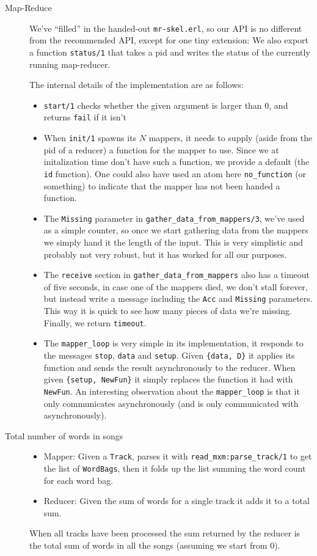\documentclass[a4paper]{article}
\begin{document}
\begin{description}
\item[Map-Reduce] We've ``filled'' in the handed-out \texttt{mr-skel.erl}, so our API is no different from the recommended API, except for one tiny extension: We also export a function \texttt{status/1} that takes a pid and writes the status of the currently running map-reducer.
  
  The internal details of the implementation are as follows:
  \begin{itemize}
  \item \texttt{start/1} checks whether the given argument is larger than $0$, and returns \texttt{fail} if it isn't
  \item When \texttt{init/1} spawns its $N$ mappers, it needs to supply (aside from the pid of a reducer) a function for the mapper to use. Since we at initalization time don't have such a function, we provide a default (the \texttt{id} function). One could also have used an atom here \texttt{no\_function} (or something) to indicate that the mapper has not been handed a function.
  \item The \texttt{Missing} parameter in \texttt{gather\_data\_from\_mappers/3}, we've used as a simple counter, so once we start gathering data from the mappers we simply hand it the length of the input. This is very simplistic and probably not very robust, but it has worked for all our purposes.
  \item The \texttt{receive} section in \texttt{gather\_data\_from\_mappers} also has a timeout of five seconds, in case one of the mappers died, we don't stall forever, but instead write a message including the \texttt{Acc} and \texttt{Missing} parameters. This way it is quick to see how many pieces of data we're missing. Finally, we return \texttt{timeout}.
   \item The \texttt{mapper\_loop} is very simple in its implementation, it responds to the messages \texttt{stop}, \texttt{data} and \texttt{setup}. Given \texttt{\{data, D\}} it applies its function and sends the result asynchronously to the reducer. When given \texttt{\{setup, NewFun\}} it simply replaces the function it had with \texttt{NewFun}. An interesting observation about the \texttt{mapper\_loop} is that it only communicates asynchronously (and is only communicated with asynchronously).
  \end{itemize}
\item[Total number of words in songs]\hfill
  \begin{itemize}
  \item Mapper: Given a \texttt{Track}, parses it with \texttt{read\_mxm:parse\_track/1} to get the list of \texttt{WordBags}, then it folds up the list summing the word count for each word bag.
  \item Reducer: Given the sum of words for a single track it adds it to a total sum.
  \end{itemize}
  When all tracks have been processed the sum returned by the reducer is the total sum of words in all the songs (assuming we start from $0$).


\end{description}
\end{document}
